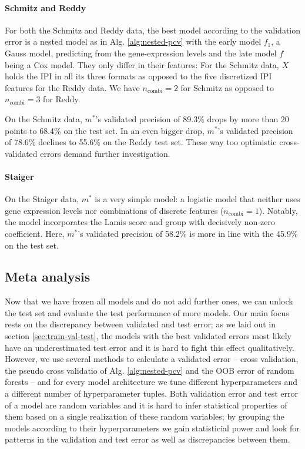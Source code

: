 \paragraph{Schmitz and Reddy}
For both the Schmitz and Reddy data, the best model according to the validation error is a nested 
model as in Alg. \ref{alg:nested-pcv} with the early model $f_1$, a Gauss model, predicting from 
the gene-expression levels and the late model $f$ being a Cox model. They only differ in their 
features: For the Schmitz data, $X$ holds the IPI in all its three formats as opposed to the five 
discretized IPI features for the Reddy data. We have $n_\text{combi} = 2$ for Schmitz as opposed to 
$n_\text{combi} = 3$ for Reddy.

On the Schmitz data, $m^*$'s validated precision of \num{89.3}\% drops by more than \num{20} points 
to \num{68.4}\% on the test set. In an even bigger drop, $m^*$'s validated precision of \num{78.6}\% 
declines to \num{55.6}\% on the Reddy test set. These way too optimistic cross-validated errors 
demand further investigation.

\paragraph{Staiger}
On the Staiger data, $m^*$ is a very simple model: a logistic model that neither uses gene 
expression levels nor combinations of discrete features ($n_\text{combi} = 1$). Notably, the model
incorporates the Lamis score and group with decisively non-zero coefficient. Here, $m^*$'s 
validated precision of \num{58.2}\% is more in line with the \num{45.9}\% on the test set.

\subsection{Meta analysis}

Now that we have frozen all models and do not add further ones, we can unlock the test set and 
evaluate the test performance of more models. Our main focus rests on the discrepancy between 
validated and test error; as we laid out in section \ref{sec:train-val-test}, the models with the 
best validated errors most likely have an underestimated test error and it is hard to fight this 
effect qualitatively. However, we use several methods to calculate a validated error -- cross 
validation, the pseudo cross validatio of Alg. \ref{alg:nested-pcv} and the OOB error of random 
forests -- and for every model architecture we tune different hyperparameters and a different 
number of hyperparameter tuples. Both validation error and test error of a model are random 
variables and it is hard to infer statistical properties of them based on a single realization of 
these random variables; by grouping the models according to their hyperparameters we gain 
statisticial power and look for patterns in the validation and test error as well as 
discrepancies between them.

